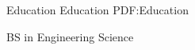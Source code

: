 \Section
{Education}
{Education}
{PDF:Education}

\Entry
\TrinityTitle
\dotfill
\textbf{}
\SubEntry
\Gap
BS in Engineering Science
